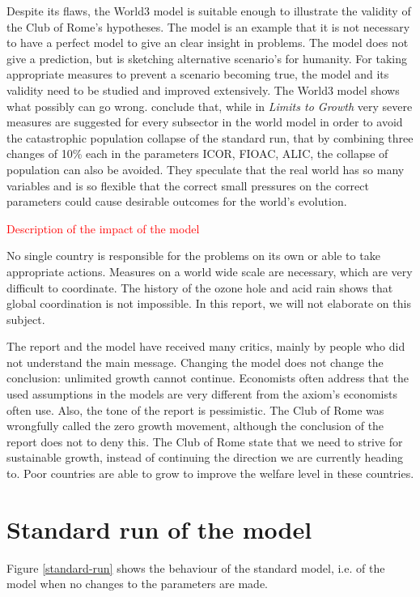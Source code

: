 \documentclass[10pt,a4paper]{scrartcl}
\begin{document}
Despite its flaws, the World3 model is suitable enough to illustrate the validity of the Club of Rome's hypotheses. The model is an example that it is not necessary to have a perfect model to give an clear insight in problems. The model does not give a prediction, but is sketching alternative scenario's for humanity. For taking appropriate measures to prevent a scenario becoming true, the model and its validity need to be studied and improved extensively. The World3 model shows what possibly can go wrong. \cite{vermeulen1976parameter} conclude that, while in \emph{Limits to Growth} very severe measures are suggested for every subsector in the world model in order to avoid the catastrophic population collapse of the standard run, that by combining three changes of 10\% each in the parameters ICOR, FIOAC, ALIC, the collapse of population can also be avoided. They speculate that the real world has so many variables and is so flexible that the correct small pressures on the correct parameters could cause desirable outcomes for the world's evolution.

\textcolor{red}{Description of the impact of the model}

No single country is responsible for the problems on its own or able to take appropriate actions. Measures on a world wide scale are necessary, which are very difficult to coordinate. The history of the ozone hole and acid rain shows that global coordination is not impossible. In this report, we will not elaborate on this subject.

The report and the model have received many critics, mainly by people who did not understand the main message. Changing the model does not change the conclusion: unlimited growth cannot continue. Economists often address that the used assumptions in the models are very different from the axiom's economists often use. Also, the tone of the report is pessimistic. The Club of Rome was wrongfully called the zero growth movement, although the conclusion of the report does not to deny this. The Club of Rome state that we need to strive for sustainable growth, instead of continuing the direction we are currently heading to. Poor countries are able to grow to improve the welfare level in these countries.

\section*{Standard run of the model}

Figure \ref{standard-run} shows the behaviour of the standard model, i.e. of the model when no changes to the parameters are made.
\end{document}
